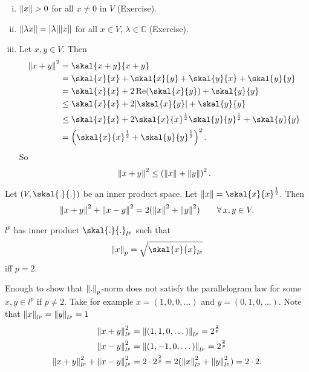 \begin{beweis}
	\begin{enumerate}[(i)]
		\item $\norm{x} >0$ for all $x \neq 0$ in $V$ (Exercise).
		\item $\norm{\lambda x} = \abs{\lambda} \norm{x}$ for all $x \in V$, $\lambda \in \mathbb{C}$ (Exercise).
		\item Let $x,y \in V$. Then 
		\begin{align*}
			\norm{x+y}^2 &= \skal{x+y}{x+y} \\ &= \skal{x}{x}+ \skal{x}{y}+ \skal{y}{x} + \skal{y}{y} \\
			&= \skal{x}{x} + 2 \re( \skal{x}{y}) + \skal{y}{y} \\
			&\leq  \skal{x}{x}+ 2 \abs{\skal{x}{y}} + \skal{y}{y} \\
			&\leq  \skal{x}{x} + 2 \skal{x}{x}^{\frac{1}{2}}\skal{y}{y}^{\frac{1}{2}} + \skal{y}{y} \\
			&= \left( \skal{x}{x}^{\frac{1}{2}} + \skal{y}{y}^{\frac{1}{2}} \right)^2.
		\end{align*} 
		So
		\[
			\norm{x+y}^2 \leq \left( \norm{x} + \norm{y} \right)^2.
		\]
	\end{enumerate}
\end{beweis}
\begin{theorem}
	Let $(V, \skal{.}{.})$ be an inner product space. Let $\norm{x} = \skal{x}{x}^{\frac{1}{2}}$. Then
	\[
		\norm{x+y}^2 + \norm{x-y}^2 = 2 (\norm{x}^2 + \norm{y}^2) \qquad \forall\, x,y \in V.
	\]
\end{theorem}
\begin{satz}
	$l^p$ has inner product $\skal{.}{.}_{l^p}$ such that
	\[
		\norm{x}_p = \sqrt{\skal{x}{x}_{l^p}}
	\]
	iff $p =2$.
\end{satz}
\begin{beweis}
	Enough to show that $\norm{.}_p$-norm does not satisfy the parallelogram law for some $x,y \in l^p$ if $p \neq 2$. Take for example $x = (1,0,0, \dots)$
	and $y= (0,1,0, \dots)$. Note that $\norm{x}_{l^p} = \norm{y}_{l^p} = 1$
	\begin{align*}
		\norm{x+y}^2_{l^p} &= \norm{(1,1,0, \dots)}_{l^p} = 2^{\frac{2}{p}} \\
		\norm{x-y}^2_{l^p} &= \norm{(1,-1,0,\dots)}_{l^p} = 2^{\frac{2}{p}} \\
		\norm{x+y}^2_{l^p} + \norm{x-y}_{l^p}^2 &= 2 \cdot 2^{\frac{2}{p}} = 2( \norm{x}^2_{l^p}+ \norm{y}^2_{l^p}) = 2 \cdot 2.
	\end{align*}
\end{beweis}
